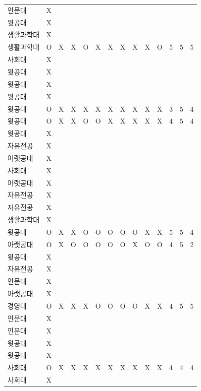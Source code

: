 \documentclass[11pt,a4paper]{article}
\begin{document}
\begin{center}
\begin{tabular}{ | p{2cm} | c | c | c | c | c | c | c | c | c | c | c | c | c | }
인문대 & X & & & & & & & & & & & & \\
윗공대 & X & & & & & & & & & & & & \\
생활과학대 & X & & & & & & & & & & & & \\
생활과학대 & O & X & X & O & X & X & X & X & X & O & 5 & 5 & 5 \\
사회대 & X & & & & & & & & & & & & \\
윗공대 & X & & & & & & & & & & & & \\
윗공대 & X & & & & & & & & & & & & \\
윗공대 & X & & & & & & & & & & & & \\
윗공대 & O & X & X & X & X & X & X & X & X & X & 3 & 5 & 4 \\
윗공대 & O & X & X & O & O & X & X & X & X & X & 4 & 5 & 4 \\
윗공대 & X & & & & & & & & & & & & \\
자유전공 & X & & & & & & & & & & & & \\
아랫공대 & X & & & & & & & & & & & & \\
사회대 & X & & & & & & & & & & & & \\
아랫공대 & X & & & & & & & & & & & & \\
자유전공 & X & & & & & & & & & & & & \\
자유전공 & X & & & & & & & & & & & & \\
생활과학대 & X & & & & & & & & & & & & \\
윗공대 & O & X & X & O & O & O & O & O & X & X & 5 & 5 & 4 \\
아랫공대 & O & X & O & O & O & O & O & X & O & O & 4 & 5 & 2 \\
윗공대 & X & & & & & & & & & & & & \\
자유전공 & X & & & & & & & & & & & & \\
인문대 & X & & & & & & & & & & & & \\
아랫공대 & X & & & & & & & & & & & & \\
경영대 & O & X & X & X & O & O & O & O & X & X & 4 & 5 & 5 \\
인문대 & X & & & & & & & & & & & & \\
인문대 & X & & & & & & & & & & & & \\
윗공대 & X & & & & & & & & & & & & \\
윗공대 & X & & & & & & & & & & & & \\
사회대 & O & X & X & X & X & X & X & X & X & X & 4 & 4 & 4 \\
사회대 & X & & & & & & & & & & & & \\

\end{tabular}
\end{center}
\end{document}
